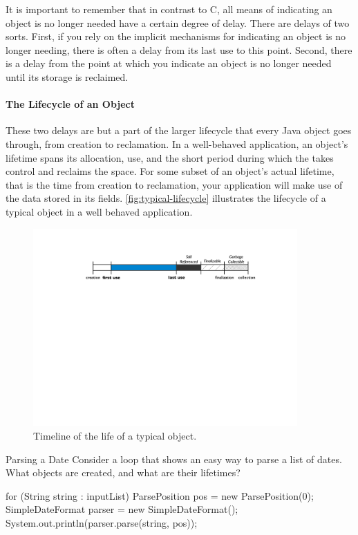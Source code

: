 It is important to remember that in contrast to C, all means of indicating an
object is no longer needed have a certain degree of delay. There are delays of
two sorts. First, if you rely on the implicit mechanisms for indicating an object is no
longer needing, there is often a delay from its last use to this point. Second,
there is a delay from the point at which you indicate an object is no longer
needed until its storage is reclaimed.

\paragraph{The Lifecycle of an Object}
These two delays are but a part of the larger lifecycle that every Java object
goes through, from creation to reclamation. In a well-behaved application, an
object's lifetime spans its allocation, use, and the short period during which
the \jre takes control and reclaims the space. For some subset of an object's
actual lifetime, that is the time from creation to reclamation, your application
will make use of the data stored in its fields. \autoref{fig:typical-lifecycle}
illustrates the lifecycle of a typical object in a well behaved application.

\begin{figure}
	\includegraphics[width=0.9\textwidth]{part2/Figures/lifetime/object-lifecycle}
	\caption{Timeline of the life of a typical object.}
	\label{fig:typical-lifecycle}
\end{figure}


\begin{example}{Parsing a Date} Consider a loop that shows an easy way to parse
a list of dates. What objects are created, and what are their lifetimes?
\begin{shortlisting}
for (String string : inputList) {
	ParsePosition pos = new ParsePosition(0);
	SimpleDateFormat parser = new SimpleDateFormat();
	System.out.println(parser.parse(string, pos));
}
\end{shortlisting}
\end{example}

